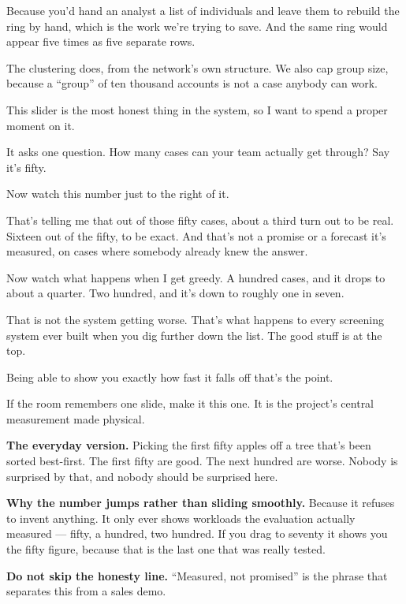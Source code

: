 \documentclass[11pt]{article}
\begin{document}
\begin{asked}
 Because you'd hand an
analyst a list of individuals and leave them to rebuild the ring by hand, which
is the work we're trying to save. And the same ring would appear five times as
five separate rows.

 The clustering does, from the
network's own structure. We also cap group size, because a ``group'' of ten
thousand accounts is not a case anybody can work.
\end{asked}


\begin{saythis}
This slider is the most honest thing in the system, so I want to spend a proper
moment on it.

It asks one question. How many cases can your team actually get through? Say
it's fifty. 

Now watch this number just to the right of it.

That's telling me that out of those fifty cases, about a third turn out to be
real. Sixteen out of the fifty, to be exact. And that's not a promise or a
forecast \bt it's measured, on cases where somebody already knew the answer.

Now watch what happens when I get greedy.  A hundred cases, and
it drops to about a quarter.  Two hundred, and it's down to
roughly one in seven.

That is not the system getting worse. That's what happens to every screening
system ever built when you dig further down the list. The good stuff is at the
top.

Being able to show you exactly how fast it falls off \bt that's the point.
\end{saythis}

\begin{means}
If the room remembers one slide, make it this one. It is the project's central
measurement made physical.

\textbf{The everyday version.} Picking the first fifty apples off a tree that's
been sorted best-first. The first fifty are good. The next hundred are worse.
Nobody is surprised by that, and nobody should be surprised here.

\textbf{Why the number jumps rather than sliding smoothly.} Because it refuses
to invent anything. It only ever shows workloads the evaluation actually
measured --- fifty, a hundred, two hundred. If you drag to seventy it shows you
the fifty figure, because that is the last one that was really tested.

\textbf{Do not skip the honesty line.} ``Measured, not promised'' is the phrase
that separates this from a sales demo.
\end{means}
\end{document}
